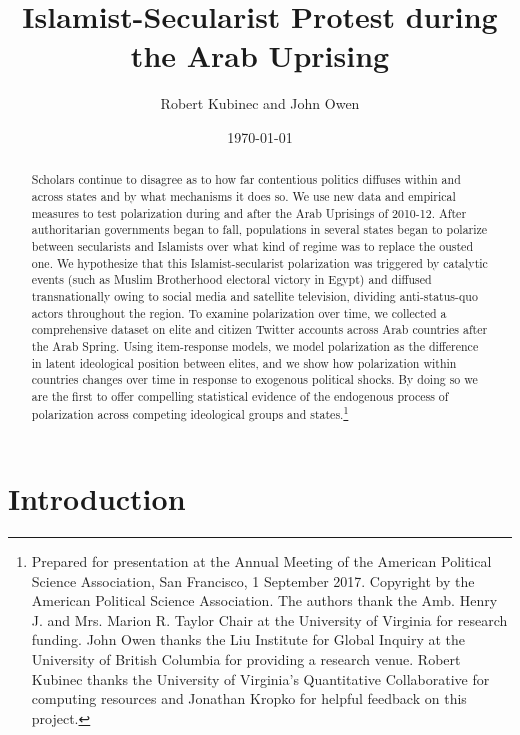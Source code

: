 \documentclass[12pt]{article}
\author{Robert Kubinec and John Owen}
\affil{\small Department of Politics \\
	\small University of Virginia}
\date{\small \today}
\title{Islamist-Secularist Protest during the Arab Uprising}
\begin{document}
\maketitle

	\begin{abstract}
		Scholars continue to disagree as to how far contentious politics diffuses within and across states and by what mechanisms it does so. We use new data and empirical measures to test polarization during and after the Arab Uprisings of 2010-12. After authoritarian governments began to fall, populations in several states began to polarize between secularists and Islamists over what kind of regime was to replace the ousted one. We hypothesize that this Islamist-secularist polarization was triggered by catalytic events (such as Muslim Brotherhood electoral victory in Egypt) and diffused transnationally owing to social media and satellite television, dividing anti-status-quo actors throughout the region. To examine polarization over time, we collected a comprehensive dataset on elite and citizen Twitter accounts across Arab countries after the Arab Spring. Using item-response models, we model polarization as the difference in latent ideological position between elites, and we show how polarization within countries changes over time in response to exogenous political shocks. By doing so we are the first to offer compelling statistical evidence of the endogenous process of polarization across competing ideological groups and states.\footnote{\linespread{.5} Prepared for presentation at the Annual Meeting of the American Political Science Association, San Francisco, 1 September 2017. Copyright  by the American Political Science Association. The authors thank the Amb. Henry J. and Mrs. Marion R. Taylor Chair at the University of Virginia for research funding.  John Owen thanks the Liu Institute for Global Inquiry at the University of British Columbia for providing a research venue. Robert Kubinec thanks the University of Virginia's Quantitative Collaborative for computing resources and Jonathan Kropko for helpful feedback on this project.}
	\end{abstract}

	\section*{Introduction}
\end{document}
